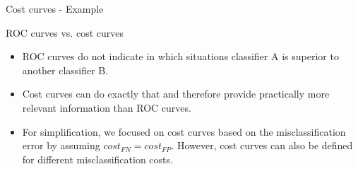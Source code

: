 \begin{frame}{Cost curves - Example}

\end{frame}


%
%
%


\begin{vbframe}{ROC curves vs. cost curves}

\begin{itemize}
  \item ROC curves do not indicate in which situations classifier A is superior to another classifier B.
  \item Cost curves can do exactly that and therefore provide practically more relevant information than ROC curves.
  \item For simplification, we focused on cost curves based on the misclassification error by assuming $cost_{FN} = cost_{FP}$.
  However, cost curves can also be defined for different misclassification costs.
  \end{itemize}

\end{vbframe}

